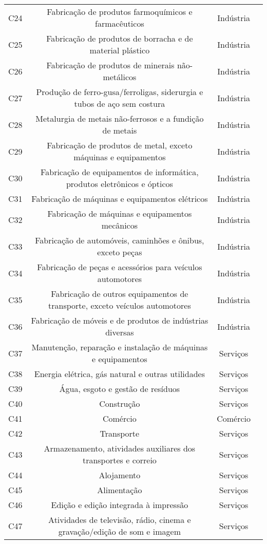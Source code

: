 \begin{apendicesenv}
\begin{small}
\begin{center}
\begin{longtable}{lccc}
				C24 & Fabricação de produtos farmoquímicos e farmacêuticos & Indústria \\
				C25 & Fabricação de produtos de borracha e de material plástico & Indústria \\
				C26 & Fabricação de produtos de minerais não-metálicos & Indústria \\
				C27 & Produção de ferro-gusa/ferroligas, siderurgia e tubos de aço sem costura & Indústria \\
				C28 & Metalurgia de metais não-ferrosos e a fundição de metais & Indústria \\
				C29 & Fabricação de produtos de metal, exceto máquinas e equipamentos & Indústria \\
				C30 & Fabricação de equipamentos de informática, produtos eletrônicos e ópticos & Indústria \\
				C31 & Fabricação de máquinas e equipamentos elétricos & Indústria \\
				C32 & Fabricação de máquinas e equipamentos mecânicos & Indústria \\
				C33 & Fabricação de automóveis, caminhões e ônibus, exceto peças & Indústria \\
				C34 & Fabricação de peças e acessórios para veículos automotores & Indústria \\
				C35 & Fabricação de outros equipamentos de transporte, exceto veículos   automotores & Indústria \\
				C36 & Fabricação de móveis e de produtos de indústrias diversas & Indústria \\
				C37 & Manutenção, reparação e instalação de máquinas e equipamentos & Serviços \\
				C38 & Energia elétrica, gás natural e outras utilidades & Serviços \\
				C39 & Água, esgoto e gestão de resíduos & Serviços \\
				C40 & Construção & Serviços \\
				C41 & Comércio & Comércio \\
				C42 & Transporte & Serviços \\
				C43 & Armazenamento, atividades auxiliares dos transportes e correio & Serviços \\
				C44 & Alojamento & Serviços \\
				C45 & Alimentação & Serviços \\
				C46 & Edição e edição integrada à impressão & Serviços \\
				C47 & Atividades de televisão, rádio, cinema e    gravação/edição de som e imagem & Serviços \\

\end{longtable}
\end{center}
\end{small}
\end{apendicesenv}
